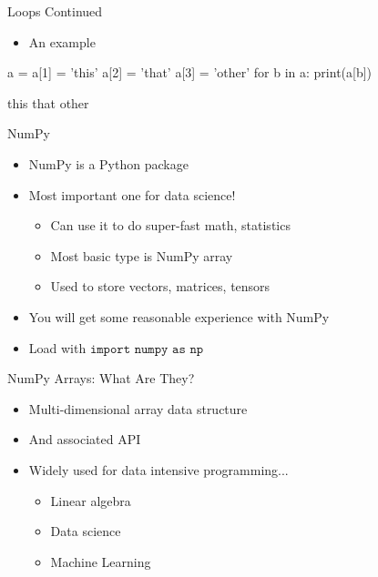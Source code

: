 \documentclass[aspectratio=169]{beamer}
\begin{document}
\begin{frame}[fragile]{Loops Continued}

\begin{itemize}
\item An example
\end{itemize}
\begin{SQL}
a = {}
a[1] = 'this'
a[2] = 'that'
a[3] = 'other'
for b in a:
   print(a[b])

this
that
other
\end{SQL}
\end{frame}

 
\begin{frame}{NumPy}

\begin{itemize}
\item NumPy is a Python package
\item Most important one for data science!
	\begin{itemize}
	\item Can use it to do super-fast math, statistics
	\item Most basic type is NumPy array
	\item Used to store vectors, matrices, tensors
	\end{itemize}
\item You will get some reasonable experience with NumPy
\item Load with $\texttt{import numpy as np}$
\end{itemize}
\end{frame}

\begin{frame}{NumPy Arrays: What Are They?}

\begin{itemize}
\item Multi-dimensional array data structure
\item And associated API
\item Widely used for data intensive programming...
 \begin{itemize}
 \item Linear algebra
 \item Data science
 \item Machine Learning
 \end{itemize}
\end{itemize}
\end{frame}
\end{document}
